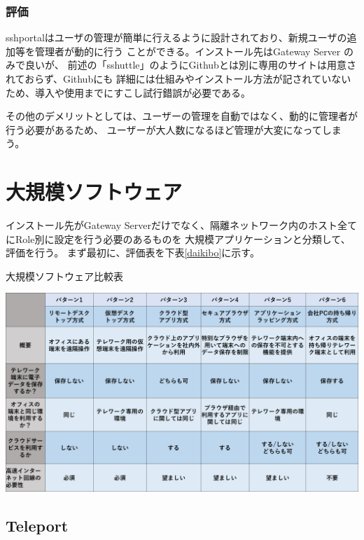 \documentclass[11pt,a4j,titlepage]{jreport}
\begin{document}
\subsection*{評価}
sshportalはユーザの管理が簡単に行えるように設計されており、新規ユーザの追加等を管理者が動的に行う
ことができる。インストール先はGateway Server のみで良いが、
前述の「sshuttle」のようにGithubとは別に専用のサイトは用意されておらず、Githubにも
詳細には仕組みやインストール方法が記されていないため、導入や使用までにすこし試行錯誤が必要である。

その他のデメリットとしては、ユーザーの管理を自動ではなく、動的に管理者が行う必要があるため、
ユーザーが大人数になるほど管理が大変になってしまう。



\chapter{大規模ソフトウェア}
インストール先がGateway Serverだけでなく、隔離ネットワーク内のホスト全てにRole別に設定を行う必要のあるものを
大規模アプリケーションと分類して、評価を行う。
まず最初に、評価表を下表\ref{daikibo}に示す。

\begin{table}[H]
    \centering
    \caption{大規模ソフトウェア比較表}
    \includegraphics*[width=1.0\textwidth,page=5]{graphs/telework_list.pdf}
    \label{daikibo}
\end{table}

\section{Teleport}\label{teleport}
\end{document}
